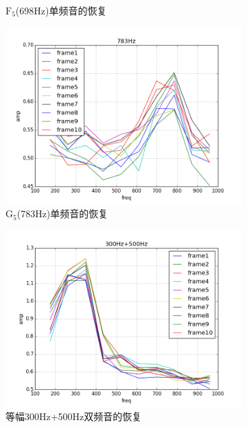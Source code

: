 \begin{figure}[h!]
\begin{center}
\begin{subfigure}[b]{.33\figwidth}
        \caption{$\text{F}_5$(698Hz)单频音的恢复}
    \end{subfigure}
    \begin{subfigure}[b]{.33\figwidth}
        \includegraphics[width=.4\figwidth]{res/data-783.png}
        \caption{$\text{G}_5$(783Hz)单频音的恢复}
    \end{subfigure}
    \begin{subfigure}[b]{.4\figwidth}
        \includegraphics[width=.4\figwidth]{res/data-300+500.png}
        \caption{等幅300Hz+500Hz双频音的恢复}
        \label{fig:real:300+500}
    \end{subfigure}
    \begin{subfigure}[b]{.4\figwidth}

\end{subfigure}
\end{center}
\end{figure}
